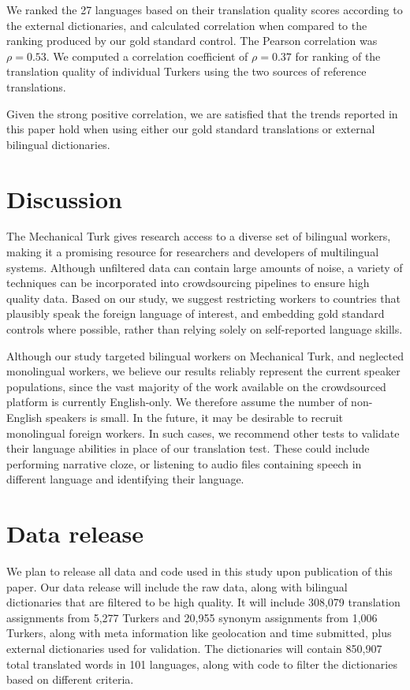 \documentclass[11pt]{article}
\begin{document}
We ranked the 27 languages based on their translation quality scores according to the external dictionaries, and calculated correlation when compared to the ranking produced by our gold standard control.  The Pearson correlation was $\rho=0.53$.  We computed a correlation coefficient of $\rho=0.37$ for ranking of the translation quality of individual Turkers using the two sources of reference translations.    

Given the strong positive correlation, we are satisfied that the trends reported in this paper hold when using either our gold standard translations or external bilingual dictionaries. 





\section{Discussion}
The Mechanical Turk gives research access to a diverse set of bilingual workers, making it a promising resource for researchers and developers of multilingual systems. 
Although unfiltered data can contain large amounts of noise, 
a variety of techniques can be incorporated into crowdsourcing pipelines to ensure high quality data.  Based on our study, we suggest restricting workers to countries that plausibly speak the foreign language of interest, and embedding gold standard controls where possible, rather than relying solely on self-reported language skills.

Although our study targeted bilingual workers on Mechanical Turk, and neglected monolingual workers, we believe our results reliably represent the current speaker populations, since the vast majority of the work available on the crowdsourced platform is currently English-only.  We therefore assume the number of non-English speakers is small.  In the future, it may be desirable to recruit monolingual foreign workers.  In such cases, we recommend other tests to validate their language abilities in place of our translation test.  These could include performing narrative cloze, or listening to audio files containing speech in different language and identifying their language. 


\section{Data release}

We plan to release all data and code used in this study upon publication of this paper.  Our data release will include the raw data, along with bilingual dictionaries that are filtered to be high quality. It will include 308,079 translation assignments from 5,277 Turkers and 20,955 synonym assignments from 1,006 Turkers, along with meta information like geolocation and time submitted, plus external dictionaries used for validation. The dictionaries will contain 850,907 total translated words in 101 languages, along with code to filter the dictionaries based on different criteria. 
 



\end{document}
